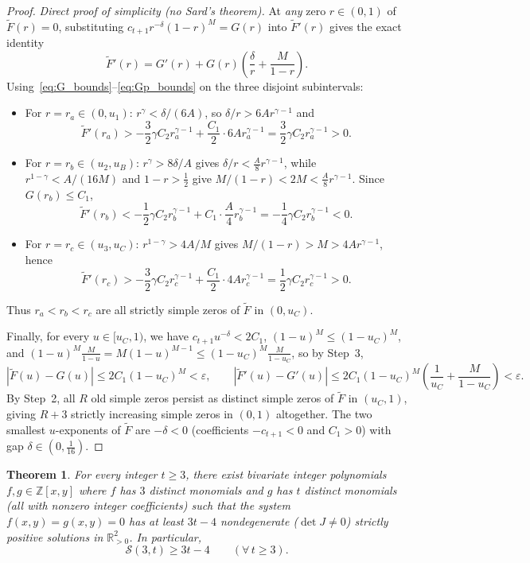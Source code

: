 \documentclass[11pt,a4paper]{amsart}
\newtheorem{theorem}{Theorem}
\theoremstyle{remark}
\newcommand{\R}{\mathbb{R}}
\newcommand{\Z}{\mathbb{Z}}
\newcommand{\Sfn}{\mathcal{S}}
\begin{document}
\begin{proof}
\emph{Direct proof of simplicity (no Sard's theorem).} At \emph{any} zero $r \in (0, 1)$ of $\widetilde{F}(r) = 0$, substituting $c_{t+1} r^{-\delta}(1-r)^M = G(r)$ into $\widetilde{F}'(r)$ gives the exact identity
\[
  \widetilde{F}'(r) = G'(r) + G(r)\!\left(\frac{\delta}{r} + \frac{M}{1 - r}\right).
\]
Using~\eqref{eq:G_bounds}--\eqref{eq:Gp_bounds} on the three disjoint subintervals:
\begin{itemize}
  \item For $r = r_a \in (0, u_1)$: $r^\gamma < \delta/(6A)$, so $\delta/r > 6 A r^{\gamma-1}$ and
  \[
    \widetilde{F}'(r_a) > -\frac{3}{2}\gamma C_2 r_a^{\gamma-1} + \frac{C_1}{2}\cdot 6 A r_a^{\gamma-1} = \frac{3}{2}\gamma C_2 r_a^{\gamma-1} > 0.
  \]
  \item For $r = r_b \in (u_2, u_B)$: $r^\gamma > 8\delta/A$ gives $\delta/r < \frac{A}{8} r^{\gamma-1}$, while $r^{1-\gamma} < A/(16 M)$ and $1 - r > \frac{1}{2}$ give $M/(1-r) < 2 M < \frac{A}{8} r^{\gamma-1}$. Since $G(r_b) \le C_1$,
  \[
    \widetilde{F}'(r_b) < -\frac{1}{2}\gamma C_2 r_b^{\gamma-1} + C_1 \cdot \frac{A}{4} r_b^{\gamma-1} = -\frac{1}{4}\gamma C_2 r_b^{\gamma-1} < 0.
  \]
  \item For $r = r_c \in (u_3, u_C)$: $r^{1-\gamma} > 4A/M$ gives $M/(1-r) > M > 4 A r^{\gamma-1}$, hence
  \[
    \widetilde{F}'(r_c) > -\frac{3}{2}\gamma C_2 r_c^{\gamma-1} + \frac{C_1}{2}\cdot 4 A r_c^{\gamma-1} = \frac{1}{2}\gamma C_2 r_c^{\gamma-1} > 0.
  \]
\end{itemize}
Thus $r_a < r_b < r_c$ are all strictly simple zeros of $\widetilde{F}$ in $(0, u_C)$.

Finally, for every $u \in [u_C, 1)$, we have $c_{t+1} u^{-\delta} < 2 C_1$, $(1-u)^M \le (1-u_C)^M$, and $(1-u)^M \frac{M}{1-u} = M(1-u)^{M-1} \le (1-u_C)^M \frac{M}{1-u_C}$, so by Step~3,
\[
  |\widetilde{F}(u) - G(u)| \le 2 C_1 (1 - u_C)^M < \varepsilon, \qquad
  |\widetilde{F}'(u) - G'(u)| \le 2 C_1 (1 - u_C)^M \!\left(\frac{1}{u_C} + \frac{M}{1 - u_C}\right) < \varepsilon.
\]
By Step~2, all $R$ old simple zeros persist as distinct simple zeros of $\widetilde{F}$ in $(u_C, 1)$, giving $R + 3$ strictly increasing simple zeros in $(0, 1)$ altogether. The two smallest $u$-exponents of $\widetilde{F}$ are $-\delta < 0$ (coefficients $-c_{t+1} < 0$ and $C_1 > 0$) with gap $\delta \in (0, \tfrac{1}{16})$.
\end{proof}

\begin{theorem}\label{thm:main}
For every integer $t \ge 3$, there exist bivariate integer polynomials $f, g \in \Z[x, y]$ where $f$ has $3$ distinct monomials and $g$ has $t$ distinct monomials (all with nonzero integer coefficients) such that the system $f(x, y) = g(x, y) = 0$ has at least $3t - 4$ nondegenerate ($\det J \neq 0$) strictly positive solutions in $\R_{>0}^2$. In particular,
\[
  \Sfn(3, t) \ge 3t - 4 \qquad (\forall\, t \ge 3).
\]
\end{theorem}
\end{document}
